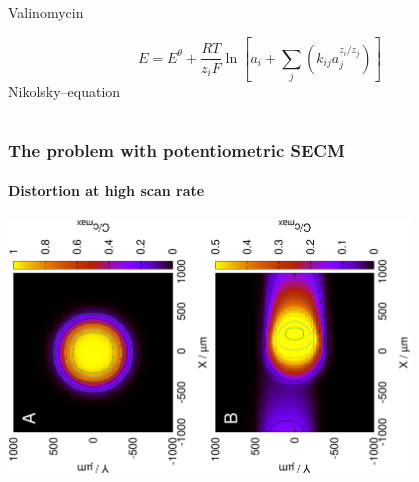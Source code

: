 \documentclass{beamer}
\begin{document}
\begin{frame}
\begin{columns}[T]
\begin{column}{.48\textwidth}
Valinomycin
\vfill

\footnotesize
\begin{equation*}
        E=E^\theta + \frac{RT}{z_iF} \ln \left [ a_i + \sum_{j} \left ( k_{ij}a_j^{z_i/z_j} \right ) \right ]
        \end{equation*}
\normalsize
Nikolsky--equation
\end{column}%
\end{columns}
\end{frame}

\begin{frame}
	\frametitle{The problem with potentiometric SECM} 
	\framesubtitle{Distortion at high scan rate}
	\centering
	\includegraphics[trim = 10mm 30mm 0mm 20mm, clip, width=0.4\textwidth, angle=-90]{real.eps}\hfill\includegraphics[trim = 10mm 30mm 0mm 20mm, clip, width=0.4\textwidth, angle=-90]{fastcomb_sim.eps}
\end{frame}
\end{document}
